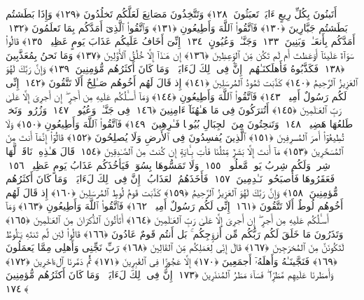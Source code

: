  أَتَبنُونَ بِكُلِّ رِيعٍ ءَايَةًۭ تَعبَثُونَ ﴿١٢٨﴾
 وَتَتَّخِذُونَ مَصَانِعَ لَعَلَّكُم تَخلُدُونَ ﴿١٢٩﴾
 وَإِذَا بَطَشتُم بَطَشتُم جَبَّارِينَ ﴿١٣٠﴾
 فَٱتَّقُوا۟ ٱللَّهَ وَأَطِيعُونِ ﴿١٣١﴾
 وَٱتَّقُوا۟ ٱلَّذِىٓ أَمَدَّكُم بِمَا تَعلَمُونَ ﴿١٣٢﴾
 أَمَدَّكُم بِأَنعَـٰمٍۢ وَبَنِينَ ﴿١٣٣﴾
 وَجَنَّـٰتٍۢ وَعُيُونٍ ﴿١٣٤﴾
 إِنِّىٓ أَخَافُ عَلَيكُم عَذَابَ يَومٍ عَظِيمٍۢ ﴿١٣٥﴾
 قَالُوا۟ سَوَآءٌ عَلَينَآ أَوَعَظتَ أَم لَم تَكُن مِّنَ ٱلوَٟعِظِينَ ﴿١٣٦﴾
 إِن هَـٰذَآ إِلَّا خُلُقُ ٱلأَوَّلِينَ ﴿١٣٧﴾
 وَمَا نَحنُ بِمُعَذَّبِينَ ﴿١٣٨﴾
 فَكَذَّبُوهُ فَأَهلَكنَـٰهُم ۗ إِنَّ فِى ذَٟلِكَ لَءَايَةًۭ ۖ وَمَا كَانَ أَكثَرُهُم مُّؤمِنِينَ ﴿١٣٩﴾
 وَإِنَّ رَبَّكَ لَهُوَ ٱلعَزِيزُ ٱلرَّحِيمُ ﴿١٤٠﴾
 كَذَّبَت ثَمُودُ ٱلمُرسَلِينَ ﴿١٤١﴾
 إِذ قَالَ لَهُم أَخُوهُم صَـٰلِحٌ أَلَا تَتَّقُونَ ﴿١٤٢﴾
 إِنِّى لَكُم رَسُولٌ أَمِينٌۭ ﴿١٤٣﴾
 فَٱتَّقُوا۟ ٱللَّهَ وَأَطِيعُونِ ﴿١٤٤﴾
 وَمَآ أَسـَٔلُكُم عَلَيهِ مِن أَجرٍ ۖ إِن أَجرِىَ إِلَّا عَلَىٰ رَبِّ ٱلعَـٰلَمِينَ ﴿١٤٥﴾
 أَتُترَكُونَ فِى مَا هَـٰهُنَآ ءَامِنِينَ ﴿١٤٦﴾
 فِى جَنَّـٰتٍۢ وَعُيُونٍۢ ﴿١٤٧﴾
 وَزُرُوعٍۢ وَنَخلٍۢ طَلعُهَا هَضِيمٌۭ ﴿١٤٨﴾
 وَتَنحِتُونَ مِنَ ٱلجِبَالِ بُيُوتًۭا فَـٰرِهِينَ ﴿١٤٩﴾
 فَٱتَّقُوا۟ ٱللَّهَ وَأَطِيعُونِ ﴿١٥٠﴾
 وَلَا تُطِيعُوٓا۟ أَمرَ ٱلمُسرِفِينَ ﴿١٥١﴾
 ٱلَّذِينَ يُفسِدُونَ فِى ٱلأَرضِ وَلَا يُصلِحُونَ ﴿١٥٢﴾
 قَالُوٓا۟ إِنَّمَآ أَنتَ مِنَ ٱلمُسَحَّرِينَ ﴿١٥٣﴾
 مَآ أَنتَ إِلَّا بَشَرٌۭ مِّثلُنَا فَأتِ بِـَٔايَةٍ إِن كُنتَ مِنَ ٱلصَّـٰدِقِينَ ﴿١٥٤﴾
 قَالَ هَـٰذِهِۦ نَاقَةٌۭ لَّهَا شِربٌۭ وَلَكُم شِربُ يَومٍۢ مَّعلُومٍۢ ﴿١٥٥﴾
 وَلَا تَمَسُّوهَا بِسُوٓءٍۢ فَيَأخُذَكُم عَذَابُ يَومٍ عَظِيمٍۢ ﴿١٥٦﴾
 فَعَقَرُوهَا فَأَصبَحُوا۟ نَـٰدِمِينَ ﴿١٥٧﴾
 فَأَخَذَهُمُ ٱلعَذَابُ ۗ إِنَّ فِى ذَٟلِكَ لَءَايَةًۭ ۖ وَمَا كَانَ أَكثَرُهُم مُّؤمِنِينَ ﴿١٥٨﴾
 وَإِنَّ رَبَّكَ لَهُوَ ٱلعَزِيزُ ٱلرَّحِيمُ ﴿١٥٩﴾
 كَذَّبَت قَومُ لُوطٍ ٱلمُرسَلِينَ ﴿١٦٠﴾
 إِذ قَالَ لَهُم أَخُوهُم لُوطٌ أَلَا تَتَّقُونَ ﴿١٦١﴾
 إِنِّى لَكُم رَسُولٌ أَمِينٌۭ ﴿١٦٢﴾
 فَٱتَّقُوا۟ ٱللَّهَ وَأَطِيعُونِ ﴿١٦٣﴾
 وَمَآ أَسـَٔلُكُم عَلَيهِ مِن أَجرٍ ۖ إِن أَجرِىَ إِلَّا عَلَىٰ رَبِّ ٱلعَـٰلَمِينَ ﴿١٦٤﴾
 أَتَأتُونَ ٱلذُّكرَانَ مِنَ ٱلعَـٰلَمِينَ ﴿١٦٥﴾
 وَتَذَرُونَ مَا خَلَقَ لَكُم رَبُّكُم مِّن أَزوَٟجِكُم ۚ بَل أَنتُم قَومٌ عَادُونَ ﴿١٦٦﴾
 قَالُوا۟ لَئِن لَّم تَنتَهِ يَـٰلُوطُ لَتَكُونَنَّ مِنَ ٱلمُخرَجِينَ ﴿١٦٧﴾
 قَالَ إِنِّى لِعَمَلِكُم مِّنَ ٱلقَالِينَ ﴿١٦٨﴾
 رَبِّ نَجِّنِى وَأَهلِى مِمَّا يَعمَلُونَ ﴿١٦٩﴾
 فَنَجَّينَـٰهُ وَأَهلَهُۥٓ أَجمَعِينَ ﴿١٧٠﴾
 إِلَّا عَجُوزًۭا فِى ٱلغَٰبِرِينَ ﴿١٧١﴾
 ثُمَّ دَمَّرنَا ٱلءَاخَرِينَ ﴿١٧٢﴾
 وَأَمطَرنَا عَلَيهِم مَّطَرًۭا ۖ فَسَآءَ مَطَرُ ٱلمُنذَرِينَ ﴿١٧٣﴾
 إِنَّ فِى ذَٟلِكَ لَءَايَةًۭ ۖ وَمَا كَانَ أَكثَرُهُم مُّؤمِنِينَ ﴿١٧٤﴾

